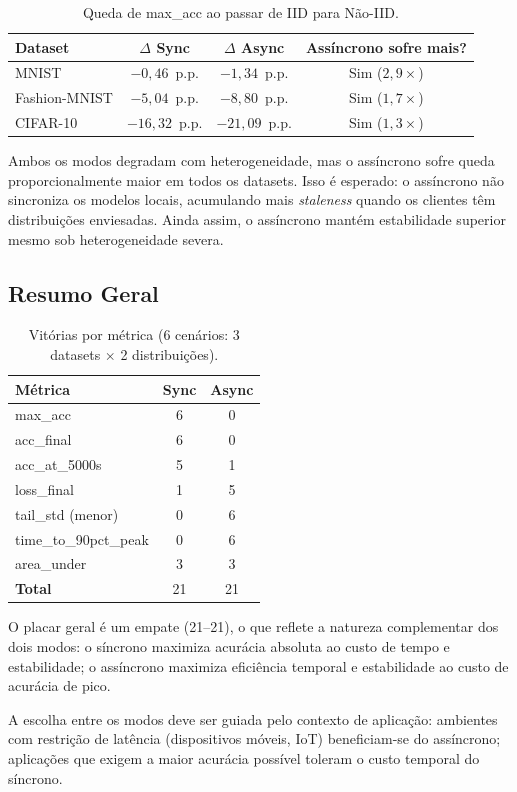 \documentclass[12pt, a4paper]{article}
\begin{document}
\begin{table}[H]
\centering
\caption{Queda de max\_acc ao passar de IID para Não-IID.}
\label{tab:heterogeneity}
\renewcommand{\arraystretch}{1.25}
\begin{tabular}{lccc}
\toprule
\textbf{Dataset} & \textbf{$\Delta$ Sync} & \textbf{$\Delta$ Async} & \textbf{Assíncrono sofre mais?} \\
\midrule
MNIST         & $-0{,}46$~p.p. & $-1{,}34$~p.p. & Sim ($2{,}9{\times}$) \\
Fashion-MNIST & $-5{,}04$~p.p. & $-8{,}80$~p.p. & Sim ($1{,}7{\times}$) \\
CIFAR-10      & $-16{,}32$~p.p. & $-21{,}09$~p.p. & Sim ($1{,}3{\times}$) \\
\bottomrule
\end{tabular}
\end{table}

Ambos os modos degradam com heterogeneidade, mas o assíncrono sofre queda
proporcionalmente maior em todos os datasets. Isso é esperado: o assíncrono não
sincroniza os modelos locais, acumulando mais \textit{staleness} quando os clientes
têm distribuições enviesadas. Ainda assim, o assíncrono mantém estabilidade superior
mesmo sob heterogeneidade severa.

\subsection{Resumo Geral}

\begin{table}[H]
\centering
\caption{Vitórias por métrica (6 cenários: 3 datasets $\times$ 2 distribuições).}
\label{tab:summary}
\renewcommand{\arraystretch}{1.25}
\begin{tabular}{lcc}
\toprule
\textbf{Métrica} & \textbf{Sync} & \textbf{Async} \\
\midrule
max\_acc             & 6 & 0 \\
acc\_final           & 6 & 0 \\
acc\_at\_5000s       & 5 & 1 \\
loss\_final          & 1 & 5 \\
tail\_std (menor)    & 0 & 6 \\
time\_to\_90pct\_peak & 0 & 6 \\
area\_under          & 3 & 3 \\
\midrule
\textbf{Total}       & 21 & 21 \\
\bottomrule
\end{tabular}
\end{table}

O placar geral é um empate (21--21), o que reflete a natureza complementar dos dois
modos: o síncrono maximiza acurácia absoluta ao custo de tempo e estabilidade; o
assíncrono maximiza eficiência temporal e estabilidade ao custo de acurácia de pico.

A escolha entre os modos deve ser guiada pelo contexto de aplicação: ambientes com
restrição de latência (dispositivos móveis, IoT) beneficiam-se do assíncrono;
aplicações que exigem a maior acurácia possível toleram o custo temporal do síncrono.
\end{document}
